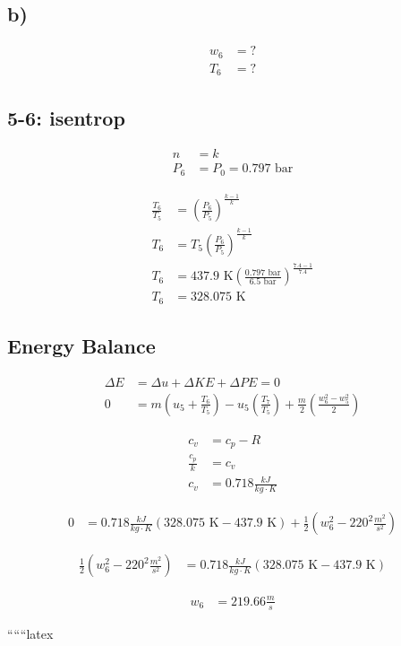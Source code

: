 

\subsection*{b)}

\begin{align*}
w_6 &= ? \\
T_6 &= ?
\end{align*}

\subsection*{5-6: isentrop}

\begin{align*}
n &= k \\
P_6 &= P_0 = 0.797 \text{ bar}
\end{align*}

\begin{align*}
\frac{T_6}{T_5} &= \left( \frac{P_6}{P_5} \right)^{\frac{k-1}{k}} \\
T_6 &= T_5 \left( \frac{P_6}{P_5} \right)^{\frac{k-1}{k}} \\
T_6 &= 437.9 \text{ K} \left( \frac{0.797 \text{ bar}}{6.5 \text{ bar}} \right)^{\frac{7.4-1}{7.4}} \\
T_6 &= 328.075 \text{ K}
\end{align*}

\subsection*{Energy Balance}

\begin{align*}
\Delta E &= \Delta u + \Delta KE + \Delta PE = 0 \\
0 &= m \left( u_5 + \frac{T_6}{T_5} \right) - u_5 \left( \frac{T_7}{T_5} \right) + \frac{m}{2} \left( \frac{w_6^2 - w_5^2}{2} \right)
\end{align*}

\begin{align*}
c_v &= c_p - R \\
\frac{c_p}{k} &= c_v \\
c_v &= 0.718 \frac{kJ}{kg \cdot K}
\end{align*}

\begin{align*}
0 &= 0.718 \frac{kJ}{kg \cdot K} \left( 328.075 \text{ K} - 437.9 \text{ K} \right) + \frac{1}{2} \left( w_6^2 - 220^2 \frac{m^2}{s^2} \right)
\end{align*}

\begin{align*}
\frac{1}{2} \left( w_6^2 - 220^2 \frac{m^2}{s^2} \right) &= 0.718 \frac{kJ}{kg \cdot K} \left( 328.075 \text{ K} - 437.9 \text{ K} \right)
\end{align*}

\begin{align*}
w_6 &= 219.66 \frac{m}{s}
\end{align*}

``````latex
